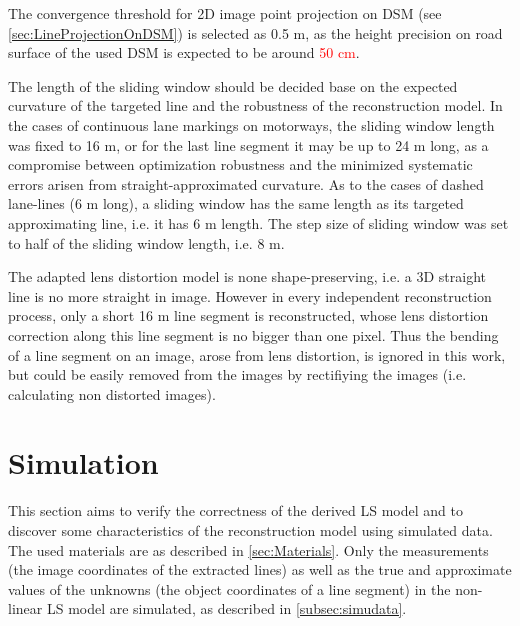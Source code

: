 The convergence threshold for 2D image point projection on DSM (see \cref{sec:LineProjectionOnDSM}) is selected as 0.5 m, as the height precision on road surface of the used DSM is expected to be around \textcolor{red}{50 cm}.


The length of the sliding window should be decided base on the expected curvature of the targeted line and the robustness of the reconstruction model. In the cases of continuous lane markings on motorways, the sliding window length was fixed to 16 m, or for the last line segment it may be up to 24 m long, as a compromise between optimization robustness and the minimized systematic errors arisen from straight-approximated curvature. As to the cases of dashed lane-lines (6 m long), a sliding window has the same length as its targeted approximating line, i.e. it has 6 m length. The step size of sliding window was set to half of the sliding window length, i.e. 8 m.









The adapted lens distortion model is none shape-preserving, i.e. a 3D straight line is no more straight in image. However in every independent reconstruction process, only a short 16 m line segment is reconstructed, whose lens distortion correction along this line segment is no bigger than one pixel. Thus the bending of a line segment on an image, arose from lens distortion, is ignored in this work, but could be easily removed from the images by rectifiying the images (i.e. calculating non distorted images).


\section{Simulation}
\label{sec:simulation}
This section aims to verify the correctness of the derived LS model and to discover some characteristics of the reconstruction model using simulated data. The used materials are as described in \cref{sec:Materials}. Only the measurements (the image coordinates of the extracted lines) as well as the true and approximate values of the unknowns (the object coordinates of a line segment) in the non-linear LS model are simulated, as described in \cref{subsec:simudata}.

